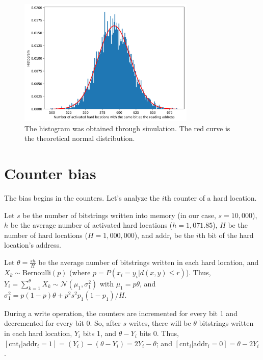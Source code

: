 \documentclass[12pt]{article}
\begin{document}
\begin{figure}[h!]
  \centering
  \includegraphics[width=0.75\textwidth]{./images02/autocorrelation/same-bit-histogram.png}

  \caption{The histogram was obtained through simulation. The red curve is the theoretical normal distribution.}
  \label{fig:sdm-same-bit-histogram}
\end{figure}

\section{Counter bias}

The bias begins in the counters. Let's analyze the $i$th counter of a hard location.

Let $s$ be the number of bitstrings written into memory (in our case, $s=10,000$), $h$ be the average number of activated hard locations ($h=1,071.85$), $H$ be the number of hard locations ($H=1,000,000$), and $\text{addr}_i$ be the $i$th bit of the hard location's address.

Let $\theta = \frac{sh}{H}$ be the average number of bitstrings written in each hard location, and $X_k \sim \text{Bernoulli}(p)$ (where $p = P(x_i = y_i | d(x, y) \le r)$). Thus, $Y_i = \sum_{k=1}^{\theta} X_k \sim \mathcal{N}(\mu_1, \sigma_1^2)$ with $\mu_1 = p \theta$, and $\sigma_1^2 = p(1-p) \theta + p^2 s^2 p_1 (1 - p_1) / H$.

During a write operation, the counters are incremented for every bit 1 and decremented for every bit 0. So, after $s$ writes, there will be $\theta$ bitstrings written in each hard location, $Y_i$ bits 1, and $\theta - Y_i$ bits 0. Thus, $[\text{cnt}_i | \text{addr}_i = 1] = (Y_i) - (\theta - Y_i) = 2Y_i - \theta$; and $[\text{cnt}_i | \text{addr}_i = 0] = \theta - 2Y_i$.
\end{document}
